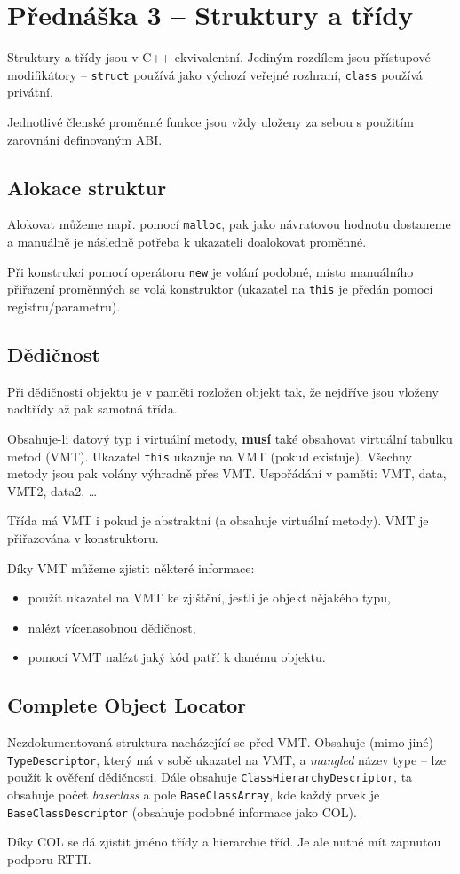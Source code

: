 \section{Přednáška 3 -- Struktury a třídy}

Struktury a třídy jsou v C++ ekvivalentní.
Jediným rozdílem jsou přístupové modifikátory -- \texttt{struct} používá jako výchozí veřejné rozhraní, \texttt{class} používá privátní.

Jednotlivé členské proměnné funkce jsou vždy uloženy za sebou s použitím zarovnání definovaným ABI.

\subsection*{Alokace struktur}

Alokovat můžeme např. pomocí \texttt{malloc}, pak jako návratovou hodnotu dostaneme a manuálně je následně potřeba k ukazateli doalokovat proměnné.

Při konstrukci pomocí operátoru \texttt{new} je volání podobné, místo manuálního přiřazení proměnných se volá konstruktor (ukazatel na \texttt{this} je předán pomocí registru/parametru).

\subsection*{Dědičnost}

Při dědičnosti objektu je v paměti rozložen objekt tak, že nejdříve jsou vloženy nadtřídy až pak samotná třída.

Obsahuje-li datový typ i virtuální metody, \textbf{musí} také obsahovat virtuální tabulku metod (VMT).
Ukazatel \texttt{this} ukazuje na VMT (pokud existuje).
Všechny metody jsou pak volány výhradně přes VMT.
Uspořádání v paměti: VMT, data, VMT2, data2, \dots

Třída má VMT i pokud je abstraktní (a obsahuje virtuální metody).
VMT je přiřazována v konstruktoru.

Díky VMT můžeme zjistit některé informace:

\begin{itemize}
    \item použít ukazatel na VMT ke zjištění, jestli je objekt nějakého typu,
    \item nalézt vícenasobnou dědičnost,
    \item pomocí VMT nalézt jaký kód patří k danému objektu.
\end{itemize}

\subsection*{Complete Object Locator}

Nezdokumentovaná struktura nacházející se před VMT.
Obsahuje (mimo jiné) \texttt{TypeDescriptor}, který má v sobě ukazatel na VMT, a \textit{mangled} název type -- lze použít k ověření dědičnosti.
Dále obsahuje \texttt{ClassHierarchyDescriptor}, ta obsahuje počet \textit{baseclass} a pole \texttt{BaseClassArray}, kde každý prvek je \texttt{BaseClassDescriptor} (obsahuje podobné informace jako COL).

Díky COL se dá zjistit jméno třídy a hierarchie tříd.
Je ale nutné mít zapnutou podporu RTTI.
